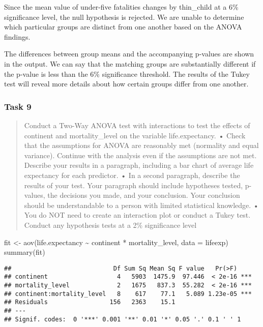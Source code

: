 \documentclass[
]{article}
\newenvironment{Shaded}{\begin{snugshade}}{\end{snugshade}}
\newcommand{\AttributeTok}[1]{\textcolor[rgb]{0.77,0.63,0.00}{#1}}
\newcommand{\FunctionTok}[1]{\textcolor[rgb]{0.00,0.00,0.00}{#1}}
\newcommand{\NormalTok}[1]{#1}
\newcommand{\OtherTok}[1]{\textcolor[rgb]{0.56,0.35,0.01}{#1}}
\newcommand{\SpecialCharTok}[1]{\textcolor[rgb]{0.00,0.00,0.00}{#1}}
\begin{document}
Since the mean value of under-five fatalities changes by thin\_child at
a 6\% significance level, the null hypothesis is rejected. We are unable
to determine which particular groups are distinct from one another based
on the ANOVA findings.

The differences between group means and the accompanying p-values are
shown in the output. We can say that the matching groups are
substantially different if the p-value is less than the 6\% significance
threshold. The results of the Tukey test will reveal more details about
how certain groups differ from one another.

\hypertarget{task-9}{%
\subsubsection{Task 9}\label{task-9}}

\begin{quote}
Conduct a Two-Way ANOVA test with interactions to test the effects of
continent and mortality\_level on the variable life.expectancy. • Check
that the assumptions for ANOVA are reasonably met (normality and equal
variance). Continue with the analysis even if the assumptions are not
met. Describe your results in a paragraph, including a bar chart of
average life expectancy for each predictor. • In a second paragraph,
describe the results of your test. Your paragraph should include
hypotheses tested, p-values, the decisions you made, and your
conclusion. Your conclusion should be understandable to a person with
limited statistical knowledge. • You do NOT need to create an
interaction plot or conduct a Tukey test. Conduct any hypothesis tests
at a 2\% significance level
\end{quote}

\begin{Shaded}
\begin{Highlighting}[]
\NormalTok{fit }\OtherTok{\textless{}{-}} \FunctionTok{aov}\NormalTok{(life.expectancy }\SpecialCharTok{\textasciitilde{}}\NormalTok{ continent }\SpecialCharTok{*}\NormalTok{ mortality\_level, }\AttributeTok{data =}\NormalTok{ lifeexp)}
\FunctionTok{summary}\NormalTok{(fit)}
\end{Highlighting}
\end{Shaded}

\begin{verbatim}
##                            Df Sum Sq Mean Sq F value   Pr(>F)    
## continent                   4   5903  1475.9  97.446  < 2e-16 ***
## mortality_level             2   1675   837.3  55.282  < 2e-16 ***
## continent:mortality_level   8    617    77.1   5.089 1.23e-05 ***
## Residuals                 156   2363    15.1                     
## ---
## Signif. codes:  0 '***' 0.001 '**' 0.01 '*' 0.05 '.' 0.1 ' ' 1
\end{verbatim}
\end{document}
